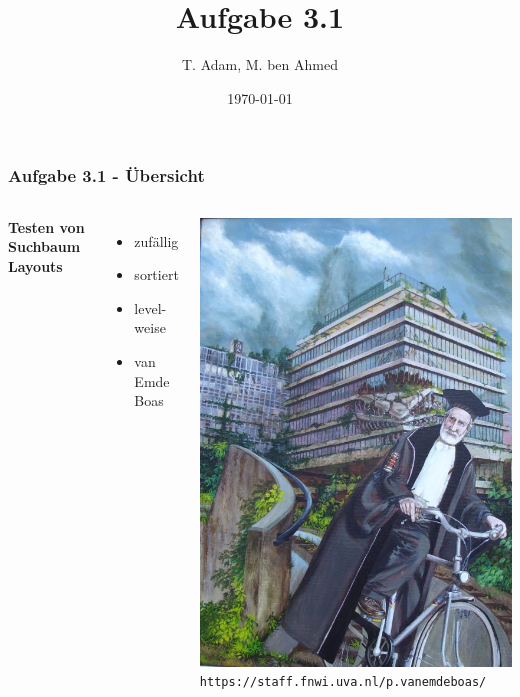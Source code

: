\documentclass[aspectratio=169]{beamer}
\title[Aufgabe 1.1]{Aufgabe 3.1} %
\author{T. Adam, M. ben Ahmed} %
\institute[UOS] %
{

Universität Osnabrück \\ %

\medskip
\textit{Æ} %


}
\date{\today} %
\begin{document}
\begin{frame}
\titlepage %
\end{frame}







\begin{frame}
	\frametitle{Aufgabe 3.1 - Übersicht}
	\begin{columns}[c] %
		
		\textbf{Testen von Suchbaum Layouts}
		\begin{itemize}
			\item zufällig
			\item sortiert
			\item level-weise
			\item van Emde Boas
		\end{itemize}

		\includegraphics[scale=.2]{portretPeter.jpg}
		\tiny \texttt{https://staff.fnwi.uva.nl/p.vanemdeboas/}
		

\end{columns}
\end{frame}
\end{document}

